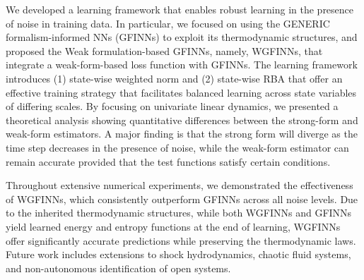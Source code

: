 \documentclass[final]{siamltex}
\begin{document}


We developed a learning framework that enables robust learning in the presence of noise in training data. 
In particular, we focused on using the GENERIC formalism-informed NNs (GFINNs) to exploit its thermodynamic structures, and proposed the Weak formulation-based GFINNs, namely, WGFINNs, that integrate a weak-form-based loss function with GFINNs. 
The learning framework introduces (1) state-wise weighted norm and (2) state-wise RBA that offer an effective training strategy that facilitates balanced learning across state variables of differing scales. 
By focusing on univariate linear dynamics, we presented a theoretical analysis showing quantitative differences between the strong-form and weak-form estimators. A major finding is that the strong form will diverge as the time step decreases in the presence of noise, while the weak-form estimator can remain accurate provided that the test functions satisfy certain conditions. 


Throughout extensive numerical experiments, we demonstrated the effectiveness of WGFINNs, which consistently outperform GFINNs across all noise levels. Due to the inherited thermodynamic structures, while both WGFINNs and GFINNs yield learned energy and entropy functions at the end of learning, WGFINNs offer significantly accurate predictions while preserving the thermodynamic laws.
Future work includes extensions to shock hydrodynamics, chaotic fluid systems, and non-autonomous identification of open systems.
\end{document}
